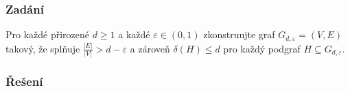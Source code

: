 \documentclass[../main.tex]{subfiles}
\begin{document}
\subsubsection*{Zadání}
Pro každé přirozené $d\geq 1$ a každé $\varepsilon\in(0,1)$ zkonstruujte graf $G_{d,\varepsilon}= (V,E)$
takový, že splňuje $\frac{|E|}{|V|} > d - \varepsilon$ a 
zároveň $\delta(H)\leq d$ pro každý podgraf $H \subseteq G_{d,\varepsilon}$.


\subsubsection*{Řešení}










\end{document}
